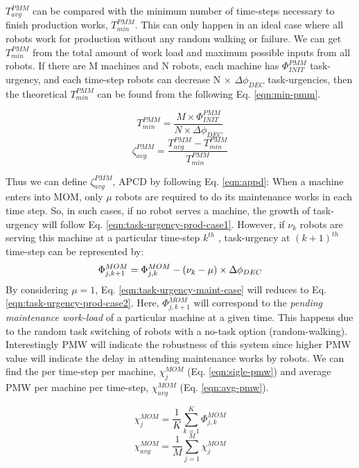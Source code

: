 \documentclass{intech}
\begin{document}
$T_{avg}^{PMM}$ can be compared with the minimum number of time-steps necessary to finish production works, $T_{min}^{PMM}$. This can only happen in an ideal case where all robots work for production without any random walking or failure. We can get $T_{min}^{PMM}$ from the total amount of work load and maximum possible inputs from all robots. If there are M machines and N robots, each machine has $\Phi_{INIT}^{PMM}$ task-urgency, and each time-step robots can decrease N $\times$ $\Delta \phi_{DEC}$ task-urgencies, then the theoretical $T_{min}^{PMM}$ can be found from the following Eq. \ref{eqn:min-pmm}.
%
\begin{multicols}{2}
\small
\begin{equation}
T_{min}^{PMM} = \frac{M \times \Phi_{INIT}^{PMM}}{N \times \Delta \phi_{DEC}} 
\label{eqn:min-pmm}
\end{equation}
\vspace*{0.2cm}
\begin{equation}
\zeta_{avg}^{PMM} = \frac{T_{avg}^{PMM} - T_{min}^{PMM}}{T_{min}^{PMM}} 
\label{eqn:appd}
\end{equation}
\end{multicols}
Thus we can define $\zeta_{avg}^{PMM}$, \acf{APCD} by following Eq. \ref{eqn:appd}:
When a machine enters into MOM, only $\mu$ robots are required to do its maintenance works in each time step. So, in such cases, if no robot serves a machine, the growth of task-urgency will follow Eq. \ref{eqn:task-urgency-prod-case1}. However, if $\nu_{k}$ robots are serving this machine at a particular time-step $k^{th}$ , task-urgency at $(k+1)^{th}$ time-step can be represented by:
\begin{equation}
\small
\Phi_{j, k+1}^{MOM} = \Phi_{j, k}^{MOM}- (\nu_{k} - \mu) \times \Delta \phi_{DEC}
\label{eqn:task-urgency-maint-case}
\end{equation}
By considering $\mu = 1$, Eq. \ref{eqn:task-urgency-maint-case} will reduces to Eq. \ref{eqn:task-urgency-prod-case2}. Here, $\Phi_{j, k+1}^{MOM}$ will correspond to the {\em pending maintenance work-load} of a particular machine at a given time. This happens due to the random task switching of robots with a no-task option (random-walking). Interestingly PMW will indicate the robustness of this system since higher PMW value will indicate the delay in attending maintenance works by robots. We can find the  per time-step per machine, $\chi_{j}^{MOM}$ (Eq. \ref{eqn:sigle-pmw}) and average PMW per machine per time-step, $\chi_{avg}^{MOM}$ (Eq. \ref{eqn:avg-pmw}).
\begin{multicols}{2}
\small
\begin{equation}
\chi_{j}^{MOM}= \frac{1}{K} \sum_{k=1}^{K} \Phi_{j, k}^{MOM}
\label{eqn:sigle-pmw}
\end{equation}
\vspace*{0.2cm}
\begin{equation}
\chi_{avg}^{MOM}= \frac{1}{M} \sum_{j=1}^{M} {\chi_{j}^{MOM}}
\label{eqn:avg-pmw}
\end{equation}
\end{multicols}
\end{document}
